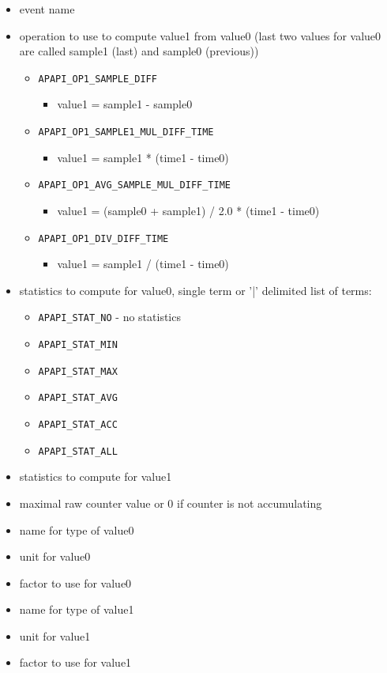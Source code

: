 \begin{itemize}

\item event name
\item operation to use to compute value1 from value0 (last two values for value0 are called sample1 (last) and sample0 (previous))

    \begin{itemize}
    \item \verb+APAPI_OP1_SAMPLE_DIFF+
        \begin{itemize}
        \item value1 = sample1 - sample0
        \end{itemize}
    \item \verb+APAPI_OP1_SAMPLE1_MUL_DIFF_TIME+
        \begin{itemize}
        \item value1 = sample1 * (time1 - time0)
        \end{itemize}
    \item \verb+APAPI_OP1_AVG_SAMPLE_MUL_DIFF_TIME+
        \begin{itemize}
        \item    value1 = (sample0 + sample1) / 2.0 * (time1 - time0)
        \end{itemize}
    \item \verb+APAPI_OP1_DIV_DIFF_TIME+
        \begin{itemize}
        \item    value1 = sample1 / (time1 - time0)
        \end{itemize}
    \end{itemize}
\item statistics to compute for value0, single term or '|' delimited list of terms:
    \begin{itemize}
    \item \verb+APAPI_STAT_NO+ - no statistics
    \item \verb+APAPI_STAT_MIN+
    \item \verb+APAPI_STAT_MAX+
    \item \verb+APAPI_STAT_AVG+
    \item \verb+APAPI_STAT_ACC+
    \item \verb+APAPI_STAT_ALL+
    \end{itemize}
\item statistics to compute for value1
\item maximal raw counter value or 0 if counter is not accumulating
\item name for type of value0
\item unit for value0
\item factor to use for value0
\item name for type of value1
\item unit for value1
\item factor to use for value1
\end{itemize}

